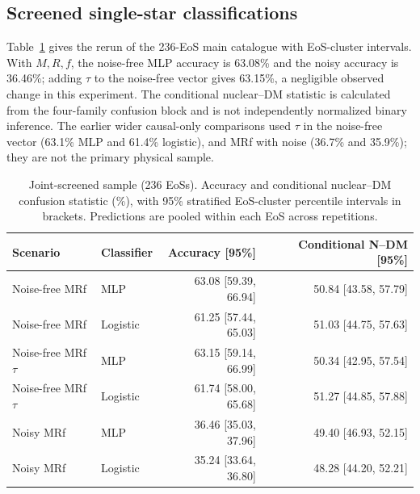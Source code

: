\documentclass[11pt,a4paper]{article}
\begin{document}
\subsection{Screened single-star classifications}
Table~\ref{tab:ml} gives the rerun of the 236-EoS main catalogue with EoS-cluster intervals. With $M,R,f$, the noise-free MLP accuracy is 63.08\% and the noisy accuracy is 36.46\%; adding $\tau$ to the noise-free vector gives 63.15\%, a negligible observed change in this experiment. The conditional nuclear--DM statistic is calculated from the four-family confusion block and is not independently normalized binary inference. The earlier wider causal-only comparisons used $\tau$ in the noise-free vector (63.1\% MLP and 61.4\% logistic), and MRf with noise (36.7\% and 35.9\%); they are not the primary physical sample.
\begin{table}[htbp]\centering\small
\caption{Joint-screened sample (236 EoSs). Accuracy and conditional nuclear--DM confusion statistic (\%), with 95\% stratified EoS-cluster percentile intervals in brackets. Predictions are pooled within each EoS across repetitions.}\label{tab:ml}
\begin{tabular}{llrr}\toprule
Scenario & Classifier & Accuracy [95\%] & Conditional N--DM [95\%]\\\midrule
Noise-free MRf & MLP & 63.08 [59.39, 66.94] & 50.84 [43.58, 57.79] \\
Noise-free MRf & Logistic & 61.25 [57.44, 65.03] & 51.03 [44.75, 57.63] \\
Noise-free MRf$\tau$ & MLP & 63.15 [59.14, 66.99] & 50.34 [42.95, 57.54] \\
Noise-free MRf$\tau$ & Logistic & 61.74 [58.00, 65.68] & 51.27 [44.85, 57.88] \\
Noisy MRf & MLP & 36.46 [35.03, 37.96] & 49.40 [46.93, 52.15] \\
Noisy MRf & Logistic & 35.24 [33.64, 36.80] & 48.28 [44.20, 52.21]
\\\bottomrule
\end{tabular}\end{table}
\end{document}
